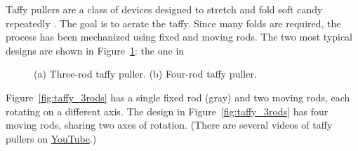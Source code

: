 \documentclass[12pt]{article}
\begin{document}
Taffy pullers are a class of devices designed to stretch and fold soft candy
repeatedly \citep{MattFinn2011_silver}.  The goal is to aerate the taffy.
Since many folds are required, the process has been mechanized using fixed and
moving rods.  The two most typical designs are shown in
Figure~\ref{fig:taffy}: the one in
%
\begin{figure}
\begin{center}
\hspace{1em}
\end{center}
\caption{(a) Three-rod taffy puller.  (b) Four-rod taffy puller.}
\label{fig:taffy}
\end{figure}
%
Figure~\ref{fig:taffy_3rods} has a single fixed rod (gray) and two moving
rods, each rotating on a different axis.  The design in
Figure~\ref{fig:taffy_3rods} has four moving rods, sharing two axes of
rotation.  (There are several videos of taffy pullers on
\href{http://www.youtube.com/watch?v=6QkGp2qBbn4}{YouTube}.)
\end{document}
